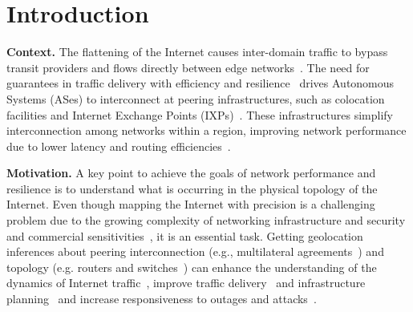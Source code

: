 \chapter{Introduction}\label{cap:introduction}
\thispagestyle{empty}

	\textbf{Context.} The flattening of the Internet causes inter-domain traffic to bypass transit providers and flows directly between edge networks~\cite{Labovitz:2010:IIT:1851182.1851194}. The need for guarantees in traffic delivery with efficiency and resilience~\cite{Yap:2017:TEO:3098822.3098854, Schlinker:2017:EEE:3098822.3098853, marcos:2018:dynamix} drives Autonomous Systems (ASes) to interconnect at peering infrastructures, such as colocation facilities and Internet Exchange Points (IXPs)~\cite{Giotsas:2015:MPI:2716281.2836122}. These infrastructures simplify interconnection among networks within a region, improving network performance due to lower latency and routing efficiencies~\cite{Chatzis:2013}.


	\textbf{Motivation.} A key point to achieve the goals of network performance and resilience is to understand what is occurring in the physical topology of the Internet. Even though mapping the Internet with precision is a challenging problem due to the growing complexity of networking infrastructure and security and commercial sensitivities~\cite{Giotsas:2015:MPI:2716281.2836122}, it is an essential task. Getting geolocation inferences about peering interconnection (e.g., multilateral agreements~\cite{Giotsas:2013}) and topology (e.g. routers and switches~\cite{8002903,Huffaker:2014:DDR:2656877.2656879}) can enhance the understanding of the dynamics of Internet traffic~\cite{marcos:2018:dynamix}, improve traffic delivery~\cite{Yap:2017:TEO:3098822.3098854, Schlinker:2017:EEE:3098822.3098853} and infrastructure planning~\cite{Calder:2013:MEG:2504730.2504754} and increase responsiveness to outages and attacks~\cite{Giotsas:2017:DPI:3098822.3098855}.

